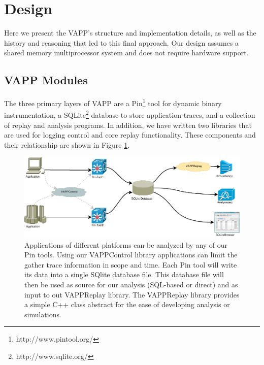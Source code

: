 \section{Design}
Here we present the VAPP's structure and implementation details,
as well as the history and reasoning that led to this final approach.
Our design assumes a shared memory multiprocessor system and does
not require hardware support.

\subsection{VAPP Modules}
The three primary layers of VAPP are a
Pin\footnote{http://www.pintool.org/} tool for dynamic binary
instrumentation, a SQLite\footnote{http://www.sqlite.org/} database to
store application traces, and a collection of replay and analysis
programs. In addition, we have written two libraries that are used for
logging control and core replay functionality. These components and
their relationship are shown in Figure \ref{fig:overview}.

\begin{figure}
  \begin{center}
  \includegraphics[width=.9\textwidth]{overview}
  \caption{Applications of different platforms can be analyzed by any
    of our Pin tools. Using our VAPPControl library applications can
    limit the gather trace information in scope and time. Each
    Pin tool will write its data into a single SQlite database
    file. This database file will then be used as source for our
    analysis (SQL-based or direct) and as input to out VAPPReplay
    library. The VAPPReplay library provides a simple C++ class
    abstract for the ease of developing analysis or simulations.}
  \label{fig:overview}
  \end{center}
\end{figure}

